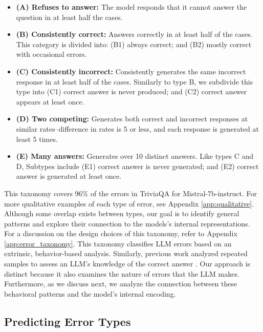 \documentclass{article} %
\begin{document}
\begin{itemize}
\item \textbf{(A) Refuses to answer:} The model responds that it cannot answer the question in at least half the cases.
\item \textbf{(B) Consistently correct:} 
Answers correctly in at least half of the cases. This category is divided into: (B1) always correct; and (B2) mostly correct with occasional errors.
\item \textbf{(C) Consistently incorrect:} Consistently generates the same incorrect response in at least half of the cases. Similarly to type B, we subdivide this type into (C1) correct answer is never produced; and (C2) correct answer appears at least once.
\item \textbf{(D) Two competing:} Generates both correct and incorrect responses at similar rates--difference in rates is 5 or less, and each response is generated at least 5 times.
\item \textbf{(E) Many answers:} 
Generates over 10 distinct answers. Like types C and D, Subtypes include (E1) correct answer is never generated; and (E2) correct answer is generated at least once.
\end{itemize}


This taxonomy covers 96\% of the errors in TriviaQA for Mistral-7b-instruct.
For more qualitative examples of each type of error, see Appendix \ref{app:qualitative}.
Although some overlap exists between types, our goal is to identify general patterns and explore their connection to the models's internal representations.
For a discussion on the design choices of this taxonomy, refer to Appendix \ref{app:error_taxonomy}.
This taxonomy classifies LLM errors based on an extrinsic, behavior-based analysis.
Similarly, previous work analyzed repeated samples to assess an LLM's knowledge of the correct answer \citep{simhi2024constructing, gekhman2024does}.
Our approach is distinct because it also examines the nature of errors that the LLM makes.
Furthermore, as we discuss next, we analyze the connection between these behavioral patterns and the model's internal encoding.

\subsection{Predicting Error Types}
\end{document}

